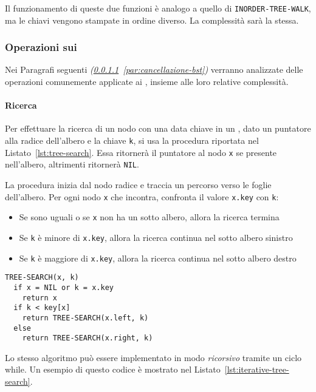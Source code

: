 \documentclass[italian, 10pt]{article}
\begin{document}
Il funzionamento di queste due funzioni è analogo a quello di \texttt{INORDER-TREE-WALK}, ma le chiavi vengono stampate in ordine diverso.
La complessità sarà la stessa.

\subsubsection{Operazioni sui \BST}
\label{sec:operazioni-bst}

Nei Paragrafi seguenti \textit{(\ref{par:ricerca-bst}~\ref{par:cancellazione-bst})} verranno analizzate delle operazioni comunemente applicate ai \BST, insieme alle loro relative complessità.

\paragraph{Ricerca}
\label{par:ricerca-bst}

Per effettuare la ricerca di un nodo con una data chiave in un \BST, dato un puntatore alla radice dell'albero e la chiave \texttt{k}, si usa la procedura riportata nel Listato~\ref{lst:tree-search}.
Essa ritornerà il puntatore al nodo \texttt{x} se presente nell'albero, altrimenti ritornerà \texttt{NIL}.

La procedura inizia dal nodo radice e traccia un percorso verso le foglie dell'albero.
Per ogni nodo \texttt{x} che incontra, confronta il valore \texttt{x.key} con \texttt{k}:

\begin{itemize}
  \item Se sono uguali o se \texttt{x} non ha un sotto albero, allora la ricerca termina
  \item Se \texttt{k} è minore di \texttt{x.key}, allora la ricerca continua nel sotto albero sinistro
  \item Se \texttt{k} è maggiore di \texttt{x.key}, allora la ricerca continua nel sotto albero destro
\end{itemize}

\begin{lstlisting}[float, style=pseudocode, caption={Ricerca di un nodo in un \BST}, label={lst:tree-search}]
TREE-SEARCH(x, k)
  if x = NIL or k = x.key
    return x
  if k < key[x]
    return TREE-SEARCH(x.left, k)
  else
    return TREE-SEARCH(x.right, k)
\end{lstlisting}

\bigskip
Lo stesso algoritmo può essere implementato in modo \textit{ricorsivo} tramite un ciclo while.
Un esempio di questo codice è mostrato nel Listato~\ref{lst:iterative-tree-search}.
\end{document}

